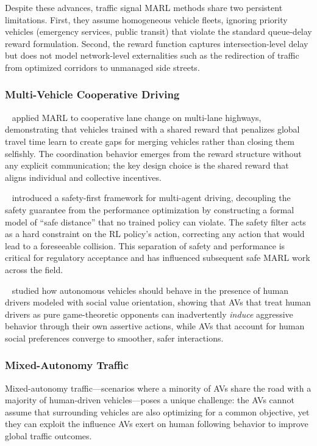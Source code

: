 \documentclass[12pt, a4paper]{article}
\begin{document}
Despite these advances, traffic signal MARL methods share two persistent
limitations.  First, they assume homogeneous vehicle fleets, ignoring priority
vehicles (emergency services, public transit) that violate the standard
queue-delay reward formulation.  Second, the reward function captures
intersection-level delay but does not model network-level externalities such
as the redirection of traffic from optimized corridors to unmanaged side streets.

\subsubsection{Multi-Vehicle Cooperative Driving}

\citeauthor{wang2018urban}~\cite{wang2018urban} applied MARL to cooperative
lane change on multi-lane highways, demonstrating that vehicles trained with
a shared reward that penalizes global travel time learn to create gaps for
merging vehicles rather than closing them selfishly.  The coordination
behavior emerges from the reward structure without any explicit communication;
the key design choice is the shared reward that aligns individual and collective
incentives.

\citeauthor{shalev2016safe}~\cite{shalev2016safe} introduced a
safety-first framework for multi-agent driving, decoupling the safety guarantee
from the performance optimization by constructing a formal model of
``safe distance'' that no trained policy can violate.  The safety filter
acts as a hard constraint on the RL policy's action, correcting any action that
would lead to a foreseeable collision.  This separation of safety and performance
is critical for regulatory acceptance and has influenced subsequent safe MARL
work across the field.

\citeauthor{schwarting2019social}~\cite{schwarting2019social} studied how
autonomous vehicles should behave in the presence of human drivers modeled
with social value orientation, showing that AVs that treat human
drivers as pure game-theoretic opponents can inadvertently \emph{induce}
aggressive behavior through their own assertive actions, while AVs that
account for human social preferences converge to smoother, safer interactions.

\subsubsection{Mixed-Autonomy Traffic}

Mixed-autonomy traffic---scenarios where a minority of AVs share the road
with a majority of human-driven vehicles---poses a unique challenge: the AVs
cannot assume that surrounding vehicles are also optimizing for a common
objective, yet they can exploit the influence AVs exert on human following
behavior to improve global traffic outcomes.
\end{document}
